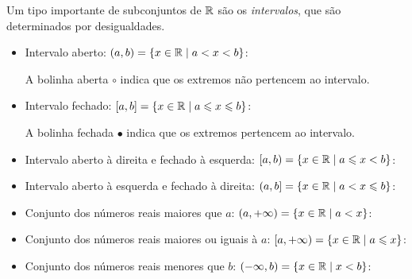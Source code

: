 Um tipo importante de subconjuntos de $\mathbb{R}$ são os \emph{intervalos}, que são determinados por desigualdades.

\begin{itemize}
 \item Intervalo aberto: $(a, b)= \{x \in \mathbb{R} \mid a < x < b\}$:
 \begin{center}
 \end{center}

 A bolinha aberta $\circ$ indica que os extremos não pertencem ao intervalo.

 \item Intervalo fechado: $[a, b]= \{x \in \mathbb{R} \mid a \leqslant x \leqslant b\}$:
 \begin{center}
 \end{center}

  A bolinha fechada $\bullet$ indica que os extremos pertencem ao intervalo.
 \item Intervalo aberto à direita e fechado à esquerda: $[a, b)= \{x \in \mathbb{R} \mid a \leqslant x < b\}$:
 \begin{center}
 \end{center}
 \item Intervalo aberto à esquerda e fechado à direita: $(a, b]= \{x \in \mathbb{R} \mid a < x \leqslant b\}$:
 \begin{center}
 \end{center}

\item Conjunto dos números reais maiores que $a$: $(a, +\infty) = \{ x \in \mathbb{R} \mid a < x \}$:
  \begin{center}
 \end{center}

\item Conjunto dos números reais maiores ou iguais à $a$: $[a, +\infty) = \{ x \in \mathbb{R} \mid a \leqslant x \}$:
 \begin{center}
 \end{center}

\item Conjunto dos números reais menores que $b$: $(-\infty, b) = \{ x \in \mathbb{R} \mid x < b \}$:
 \begin{center}
 \end{center}


\end{itemize}
